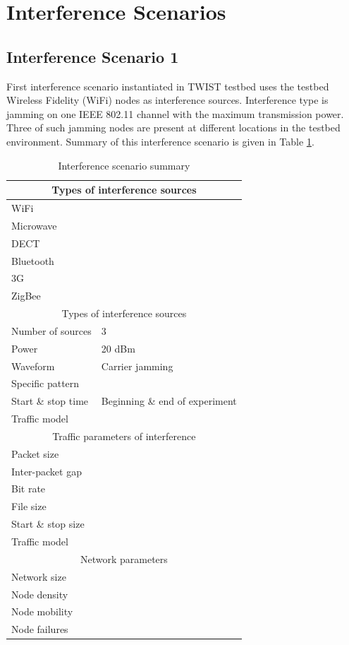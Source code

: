 \documentclass[11pt,a4paper,headinclude,footinclude,chapterprefix=on]{scrreprt}
\begin{document}
\section{Interference Scenarios}\label{sec:interference}
\subsection{Interference Scenario 1} First interference scenario instantiated in TWIST testbed uses the testbed Wireless Fidelity (WiFi) nodes as interference sources. Interference type is jamming on one IEEE 802.11 channel with the maximum transmission power. Three of such jamming nodes are present at different locations in the testbed environment. Summary of this interference scenario is given in Table \ref{tb:interf:1}.
\begin{table}
	[h] \centering \caption{Interference scenario summary} \label{tb:interf:1} 
	\begin{tabular}
		{|l|l|} \hline \multicolumn{2}{|c|}{Types of interference sources} \\
		\hline WiFi & \checkmark \\
		Microwave & \texttimes \\
		DECT & \texttimes \\
		Bluetooth & \texttimes \\
		3G & \texttimes \\
		ZigBee & \texttimes \\
		\hline \multicolumn{2}{|c|}{Types of interference sources} \\
		\hline Number of sources & 3 \\
		Power & 20 dBm \\
		Waveform & Carrier jamming \\
		Specific pattern & \\
		Start \& stop time & Beginning \& end of experiment \\
		Traffic model & \\
		\hline \multicolumn{2}{|c|}{Traffic parameters of interference} \\
		\hline Packet size & \\
		Inter-packet gap & \\
		Bit rate & \\
		File size & \\
		Start \& stop size & \\
		Traffic model & \\
		\hline \multicolumn{2}{|c|}{Network parameters} \\
		\hline Network size & \\
		Node density & \\
		Node mobility & \\
		Node failures & \\
		\hline 
	\end{tabular}
\end{table}
\end{document}
